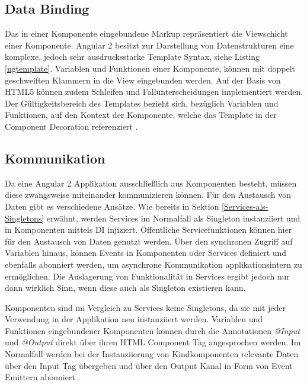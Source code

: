 \subsection{Data Binding}
Das in einer Komponente eingebundene Markup repräsentiert die Viewschicht einer Komponente.
Angular 2 besitzt zur Darstellung von Datenstrukturen eine komplexe, jedoch sehr ausdrucksstarke Template Syntax, siehe Listing \ref{ngtemplate}.
Variablen und Funktionen einer Komponente, können mit doppelt geschweiften Klammern in die View eingebunden werden.
Auf der Basis von HTML5 können zudem Schleifen und Fallunterscheidungen implementiert werden.
Der Gültigkeitsbereich des Templates bezieht sich, bezüglich Variablen und Funktionen, auf den Kontext der Komponente,
welche das Template in der Component Decoration referenziert \cite{Templ78:online}.

\vspace{0.3cm}


\subsection{Kommunikation}

Da eine Angular 2 Applikation ausschließlich aus Komponenten besteht, müssen diese zwangsweise miteinander
kommunizieren können. Für den Austausch von Daten gibt es verschiedene Ansätze.
Wie bereits in Sektion \ref{Services-als-Singletons} erwähnt, werden Services im Normalfall als Singleton
instanziiert und in Komponenten mittels \ac{DI} injiziert. Öffentliche Servicefunktionen können hier für den
Austausch von Daten genutzt werden. Über den synchronen Zugriff auf Variablen hinaus,
können Events in Komponenten oder Services definiert und ebenfalls abonniert werden,
um asynchrone Kommunikation applikationsintern zu ermöglichen. Die Auslagerung von Funktionalität in Services ergibt jedoch nur dann wirklich Sinn,
wenn diese auch als Singleton existieren kann.

Komponenten sind im Vergleich zu Services keine Singletons,
da sie mit jeder Verwendung in der Applikation neu instanziiert werden.
Variablen und Funktionen eingebundener Komponenten können durch die Annotationen \emph{@Input} und \emph{@Output}
direkt über ihren HTML Component Tag angesprochen werden. Im Normalfall werden bei der Instanziierung von Kindkomponenten
relevante Daten über den Input Tag übergeben und über den Output Kanal in Form von Event Emittern abonniert \cite{Angul94:online}.

